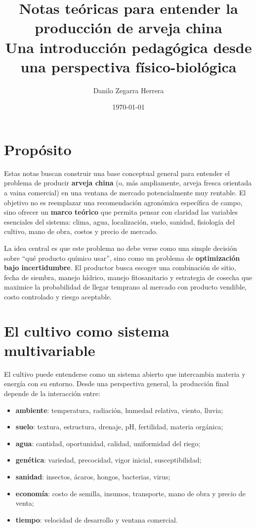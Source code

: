 \documentclass[11pt,a4paper]{article}
\title{\textbf{Notas teóricas para entender la producción de arveja china}\\
\large Una introducción pedagógica desde una perspectiva físico-biológica}
\author{Danilo Zegarra Herrera}
\date{\today}
\begin{document}
\maketitle

\section*{Propósito}

Estas notas buscan construir una base conceptual general para entender el problema de producir \textbf{arveja china} (o, más ampliamente, arveja fresca orientada a vaina comercial) en una ventana de mercado potencialmente muy rentable. El objetivo no es reemplazar una recomendación agronómica específica de campo, sino ofrecer un \textbf{marco teórico} que permita pensar con claridad las variables esenciales del sistema: clima, agua, localización, suelo, sanidad, fisiología del cultivo, mano de obra, costos y precio de mercado.

La idea central es que este problema no debe verse como una simple decisión sobre \enquote{qué producto químico usar}, sino como un problema de \textbf{optimización bajo incertidumbre}. El productor busca escoger una combinación de sitio, fecha de siembra, manejo hídrico, manejo fitosanitario y estrategia de cosecha que maximice la probabilidad de llegar temprano al mercado con producto vendible, costo controlado y riesgo aceptable.

\section{El cultivo como sistema multivariable}

El cultivo puede entenderse como un sistema abierto que intercambia materia y energía con su entorno. Desde una perspectiva general, la producción final depende de la interacción entre:

\begin{itemize}[leftmargin=1.5em]
    \item \textbf{ambiente}: temperatura, radiación, humedad relativa, viento, lluvia;
    \item \textbf{suelo}: textura, estructura, drenaje, pH, fertilidad, materia orgánica;
    \item \textbf{agua}: cantidad, oportunidad, calidad, uniformidad del riego;
    \item \textbf{genética}: variedad, precocidad, vigor inicial, susceptibilidad;
    \item \textbf{sanidad}: insectos, ácaros, hongos, bacterias, virus;
    \item \textbf{economía}: costo de semilla, insumos, transporte, mano de obra y precio de venta;
    \item \textbf{tiempo}: velocidad de desarrollo y ventana comercial.
\end{itemize}
\end{document}
